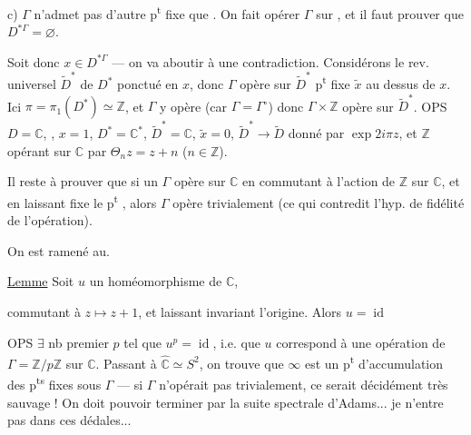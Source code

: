  c) $\Gamma$ n'admet pas d'autre p\textsuperscript{t} fixe que . On fait opérer $\Gamma$  sur , et il faut prouver que $D^{*\Gamma}=\varnothing$.



Soit donc $x\in D^{*\Gamma}$ --- on va aboutir à une contradiction. Considérons le rev. universel $\widetilde D^*$ de $D^*$ ponctué en $x$,  donc $\Gamma$ opère sur $\widetilde D^*$  p\textsuperscript{t} fixe $\widetilde x$ au dessus de $x$. Ici $\pi=\pi_1(D^*)\simeq\mathbb Z$, et $\Gamma$ y opère  (car $\Gamma=\Gamma^\circ$) donc $\Gamma\times\mathbb Z$ opère sur $\widetilde D^*$. OPS $D=\mathbb C$, , $x=1$, $D^*=\mathbb C^*$, $\widetilde D^*=\mathbb C$, $\widetilde x=0$, $\widetilde D^*\longrightarrow\widetilde D$ donné par $\exp 2i\pi z$,  et $\mathbb Z$ opérant sur $\mathbb C$ par $\Theta_nz=z+n$ ($n\in\mathbb Z$).

 Il reste à prouver que si un  $\Gamma$ opère sur $\mathbb C$ en commutant  à l'action de $\mathbb Z$ sur $\mathbb C$, et en laissant  fixe le p\textsuperscript{t} , alors $\Gamma$ opère trivialement (ce qui contredit l'hyp. de fidélité de l'opération).

 On est ramené au.

\uline{Lemme} Soit $u$ un homéomorphisme  de $\mathbb C$,



commutant à $z\longmapsto z+1$, et laissant invariant l'origine. Alors $u=\operatorname{id}$

OPS  $\exists$ nb premier $p$ tel que $u^p=\operatorname{id}$, i.e. que $u$ correspond à une opération de $\Gamma=\mathbb Z/p\mathbb Z$ sur $\mathbb C$.  Passant à $\widehat{\mathbb C}\simeq S^2$, on trouve que $\infty$ est un p\textsuperscript{t} d'accumulation des p\textsuperscript{ts} fixes sous $\Gamma$ --- si $\Gamma$ n'opérait pas trivialement, ce serait décidément très sauvage ! On doit pouvoir terminer par la suite spectrale d'Adams... je n'entre pas dans ces dédales...

